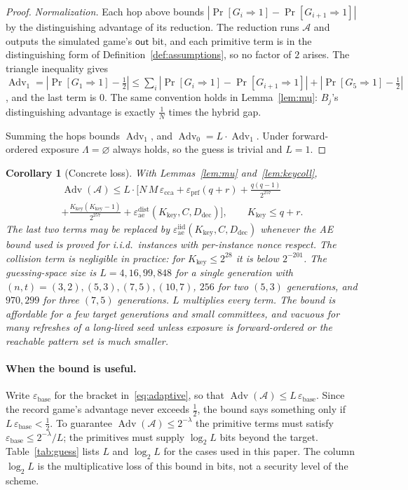 \documentclass[pdflatex,sn-mathphys-num]{sn-jnl}%
\theoremstyle{plain}
\newtheorem{corollary}[theorem]{Corollary}
\theoremstyle{definition}
\newcommand{\Adv}{\operatorname{Adv}}
\begin{document}
\begin{proof}
\emph{Normalization.} Each hop above bounds $|\Pr[G_i\Rightarrow1]-\Pr[G_{i+1}\Rightarrow1]|$ by the distinguishing advantage of its reduction. The reduction runs $\mathcal A$ and outputs the simulated game's $\mathsf{out}$ bit, and each primitive term is in the distinguishing form of Definition~\ref{def:assumptions}, so no factor of $2$ arises. The triangle inequality gives $\Adv_1=|\Pr[G_1\Rightarrow1]-\tfrac12|\le\sum_i|\Pr[G_i\Rightarrow1]-\Pr[G_{i+1}\Rightarrow1]|+|\Pr[G_5\Rightarrow1]-\tfrac12|$, and the last term is $0$. The same convention holds in Lemma~\ref{lem:mu}: $B_j$'s distinguishing advantage is exactly $\tfrac1N$ times the hybrid gap.

Summing the hops bounds $\Adv_1$, and $\Adv_0=L\cdot\Adv_1$. Under forward-ordered exposure $\Lambda=\varnothing$ always holds, so the guess is trivial and $L=1$.
\end{proof}

\begin{corollary}[Concrete loss]\label{cor:loss}
With Lemmas~\ref{lem:mu} and~\ref{lem:keycoll},
\begin{multline*}
 \Adv(\mathcal A)\le L\cdot\Big[N\,M\,\varepsilon_{\mathrm{cca}}+\varepsilon_{\mathrm{prf}}(q+r)+\frac{q(q-1)}{2^{257}}\\
 +\frac{K_{\mathrm{key}}(K_{\mathrm{key}}-1)}{2^{257}}+\varepsilon^{\mathrm{dist}}_{\mathrm{ae}}(K_{\mathrm{key}},C,D_{\mathrm{dec}})\Big],\qquad K_{\mathrm{key}}\le q+r.
\end{multline*}
The last two terms may be replaced by $\varepsilon^{\mathrm{iid}}_{\mathrm{ae}}(K_{\mathrm{key}},C,D_{\mathrm{dec}})$ whenever the AE bound used is proved for i.i.d.\ instances with per-instance nonce respect. The collision term is negligible in practice: for $K_{\mathrm{key}}\le2^{28}$ it is below $2^{-201}$.
The guessing-space size is $L=4,16,99,848$ for a single generation with $(n,t)=(3,2),(5,3),(7,5),(10,7)$, $256$ for two $(5,3)$ generations, and $970{,}299$ for three $(7,5)$ generations. $L$ multiplies every term. The bound is affordable for a few target generations and small committees, and vacuous for many refreshes of a long-lived seed unless exposure is forward-ordered or the reachable pattern set is much smaller.
\end{corollary}

\paragraph{When the bound is useful.}
Write $\varepsilon_{\mathrm{base}}$ for the bracket in~\eqref{eq:adaptive}, so that $\Adv(\mathcal A)\le L\,\varepsilon_{\mathrm{base}}$. Since the record game's advantage never exceeds $\tfrac12$, the bound says something only if $L\,\varepsilon_{\mathrm{base}}<\tfrac12$. To guarantee $\Adv(\mathcal A)\le2^{-\lambda}$ the primitive terms must satisfy $\varepsilon_{\mathrm{base}}\le2^{-\lambda}/L$; the primitives must supply $\log_2L$ bits beyond the target. Table~\ref{tab:guess} lists $L$ and $\log_2L$ for the cases used in this paper. The column $\log_2L$ is the multiplicative loss of this bound in bits, not a security level of the scheme.
\end{document}
